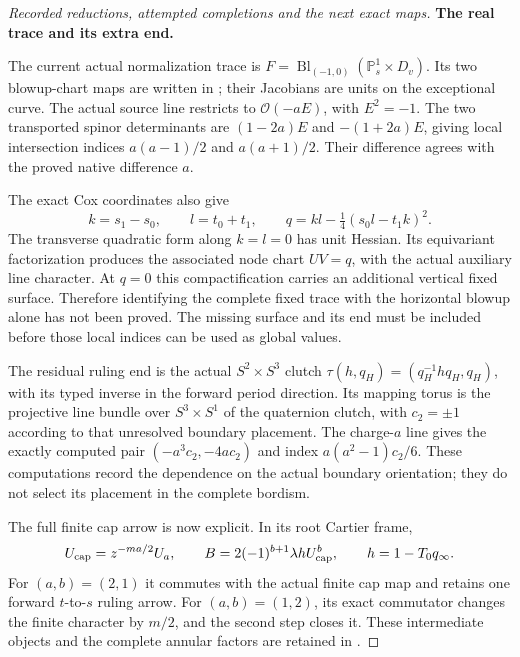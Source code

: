 \begin{proof}[Recorded reductions, attempted completions and the next exact maps]
\par\medskip\noindent\textbf{The real trace and its extra end.}\par\nopagebreak[4]
The current actual normalization trace is
\(F=\operatorname{Bl}_{(-1,0)}(\mathbb P^1_s\times D_v)\).
Its two blowup-chart maps are written in
; their
Jacobians are units on the exceptional curve. The actual
source line restricts to \(\mathcal O(-aE)\), with
\(E^2=-1\). The two transported spinor determinants are
\((1-2a)E\) and \(-(1+2a)E\), giving local intersection
indices \(a(a-1)/2\) and \(a(a+1)/2\). Their difference
agrees with the proved native difference \(a\).

The exact Cox coordinates also give
\[
 k=s_1-s_0,\qquad l=t_0+t_1,\qquad
 q=kl-\tfrac14(s_0l-t_1k)^2.
\]
The transverse quadratic form along \(k=l=0\) has unit
Hessian. Its equivariant factorization produces the associated
node chart \(UV=q\), with the actual auxiliary line character.
At \(q=0\) this compactification carries an additional
vertical fixed surface. Therefore identifying the complete
fixed trace with the horizontal blowup alone has not been
proved. The missing surface and its end must be included
before those local indices can be used as global values.

The residual ruling end is the actual
\(S^2\times S^3\) clutch
\(\tau(h,q_H)=(q_H^{-1}h q_H,q_H)\), with its typed inverse
in the forward period direction. Its mapping torus is the
projective line bundle over \(S^3\times S^1\) of the
quaternion clutch, with \(c_2=\pm1\) according to that
unresolved boundary placement. The charge-\(a\) line gives
the exactly computed pair \((-a^3c_2,-4ac_2)\) and index
\(a(a^2-1)c_2/6\). These computations record the dependence
on the actual boundary orientation; they do not select its
placement in the complete bordism.

The full finite cap arrow is now explicit. In its root
Cartier frame,
\[
 U_{\rm cap}=z^{-ma/2}U_a,\qquad
 B=2(-1)^{b+1}\lambda h U_{\rm cap}^{b},\qquad
 h=1-T_0q_\infty.
\]
For \((a,b)=(2,1)\) it commutes with the actual finite cap
map and retains one forward \(t\)-to-\(s\) ruling arrow.
For \((a,b)=(1,2)\), its exact commutator changes the finite
character by \(m/2\), and the second step closes it. These
intermediate objects and the complete annular factors are
retained in
.


\end{proof}
